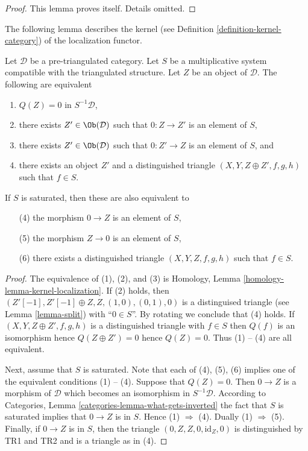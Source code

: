 \begin{proof}
This lemma proves itself. Details omitted.
\end{proof}

\noindent
The following lemma describes the kernel (see
Definition \ref{definition-kernel-category})
of the localization functor.

\begin{lemma}
\label{lemma-kernel-localization}
Let $\mathcal{D}$ be a pre-triangulated category. Let $S$ be a multiplicative
system compatible with the triangulated structure. Let $Z$ be an object
of $\mathcal{D}$. The following are equivalent
\begin{enumerate}
\item $Q(Z) = 0$ in $S^{-1}\mathcal{D}$,
\item there exists $Z' \in \Ob(\mathcal{D})$ such that
$0 : Z \to Z'$ is an element of $S$,
\item there exists $Z' \in \Ob(\mathcal{D})$ such that
$0 : Z' \to Z$ is an element of $S$, and
\item there exists an object $Z'$ and a distinguished triangle
$(X, Y, Z \oplus Z', f, g, h)$ such that $f \in S$.
\end{enumerate}
If $S$ is saturated, then these are also equivalent to
\begin{enumerate}
\item[(4)] the morphism $0 \to Z$ is an element of $S$,
\item[(5)] the morphism $Z \to 0$ is an element of $S$,
\item[(6)] there exists a distinguished triangle $(X, Y, Z, f, g, h)$
such that $f \in S$.
\end{enumerate}
\end{lemma}

\begin{proof}
The equivalence of (1), (2), and (3) is
Homology, Lemma \ref{homology-lemma-kernel-localization}.
If (2) holds, then $(Z'[-1], Z'[-1] \oplus Z, Z, (1, 0), (0, 1), 0)$
is a distinguised triangle (see
Lemma \ref{lemma-split})
with ``$0 \in S$''. By rotating we conclude that (4) holds.
If $(X, Y, Z \oplus Z', f, g, h)$ is a distinguished triangle with $f \in S$
then $Q(f)$ is an isomorphism hence $Q(Z \oplus Z') = 0$ hence $Q(Z) = 0$.
Thus (1) -- (4) are all equivalent.

\medskip\noindent
Next, assume that $S$ is saturated. Note that each of (4), (5), (6)
implies one of the equivalent conditions (1) -- (4). Suppose that
$Q(Z) = 0$. Then $0 \to Z$ is a morphism of $\mathcal{D}$ which becomes
an isomorphism in $S^{-1}\mathcal{D}$. According to
Categories, Lemma \ref{categories-lemma-what-gets-inverted}
the fact that $S$ is saturated implies that $0 \to Z$ is in $S$.
Hence (1) $\Rightarrow$ (4). Dually (1) $\Rightarrow$ (5).
Finally, if $0 \to Z$ is in $S$, then the triangle
$(0, Z, Z, 0, \text{id}_Z, 0)$ is distinguished by TR1 and TR2 and
is a triangle as in (4).
\end{proof}

